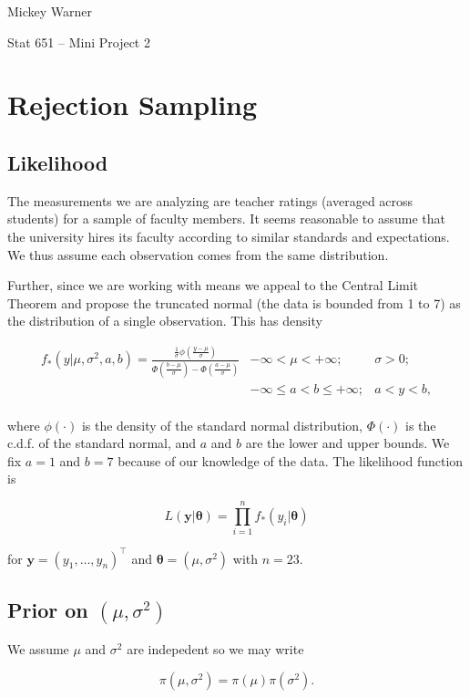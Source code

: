 \documentclass[12pt]{article}
\newcommand{\m}[1]{\mathbf{\bm{#1}}}
\begin{document}
\noindent Mickey Warner

\noindent Stat 651 -- Mini Project 2

\section{Rejection Sampling}

\subsection{Likelihood}

\noindent The measurements we are analyzing are teacher ratings (averaged across students) for a sample of faculty members. It seems reasonable to assume that the university hires its faculty according to similar standards and expectations. We thus assume each observation comes from the same distribution.
\bigskip

\noindent Further, since we are working with means we appeal to the Central Limit Theorem and propose the truncated normal (the data is bounded from 1 to 7) as the distribution of a single observation. This has density

\begin{eqnarray*}
f_*(y|\mu,\sigma^2,a,b) = \frac{\frac{1}{\sigma}\phi(\frac{y-\mu}{\sigma})}{\Phi(\frac{b-\mu}{\sigma})-\Phi(\frac{a-\mu}{\sigma})} & -\infty < \mu < +\infty; & \sigma > 0; \\
& -\infty \leq a < b \leq +\infty; & a < y < b, \\
\end{eqnarray*}

\noindent where $\phi(\cdot)$ is the density of the standard normal distribution, $\Phi(\cdot)$ is the c.d.f. of the standard normal, and $a$ and $b$ are the lower and upper bounds. We fix $a=1$ and $b=7$ because of our knowledge of the data. The likelihood function is

\[L(\m{y}|\m{\theta}) = \prod_{i=1}^n f_*(y_i|\m{\theta}) \]

\noindent for $\m{y}=(y_1,\ldots,y_n)^\top$ and $\m{\theta}=(\mu, \sigma^2)$ with $n=23$.

\subsection{Prior on $(\mu, \sigma^2)$}

\noindent We assume $\mu$ and $\sigma^2$ are indepedent so we may write

\[ \pi(\mu, \sigma^2) = \pi(\mu)\pi(\sigma^2). \]
\end{document}
